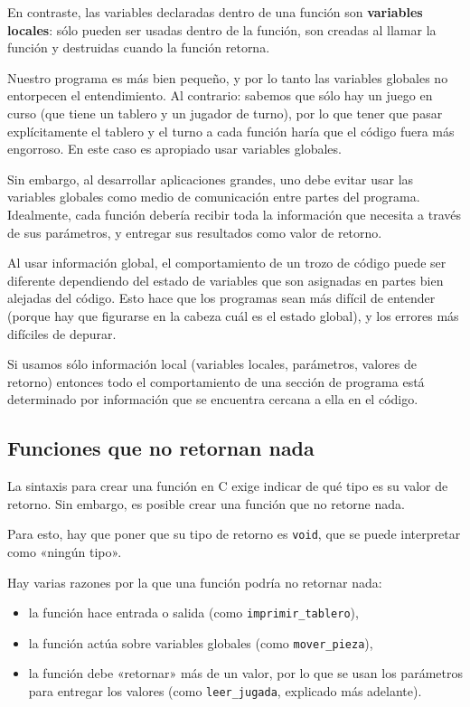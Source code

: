 En contraste, las variables declaradas dentro de una función son
\textbf{variables locales}: sólo pueden ser usadas dentro de la función,
son creadas al llamar la función y destruidas cuando la función retorna.

Nuestro programa es más bien pequeño, y por lo tanto las variables
globales no entorpecen el entendimiento. Al contrario: sabemos que sólo
hay un juego en curso (que tiene un tablero y un jugador de turno), por
lo que tener que pasar explícitamente el tablero y el turno a cada
función haría que el código fuera más engorroso. En este caso es
apropiado usar variables globales.

Sin embargo, al desarrollar aplicaciones grandes, uno debe evitar usar
las variables globales como medio de comunicación entre partes del
programa. Idealmente, cada función debería recibir toda la información
que necesita a través de sus parámetros, y entregar sus resultados como
valor de retorno.

Al usar información global, el comportamiento de un trozo de código
puede ser diferente dependiendo del estado de variables que son
asignadas en partes bien alejadas del código. Esto hace que los
programas sean más difícil de entender (porque hay que figurarse en la
cabeza cuál es el estado global), y los errores más difíciles de
depurar.

Si usamos sólo información local (variables locales, parámetros, valores
de retorno) entonces todo el comportamiento de una sección de programa
está determinado por información que se encuentra cercana a ella en el
código.

\subsection{Funciones que no retornan nada}

La sintaxis para crear una función en C exige indicar de qué tipo es su
valor de retorno. Sin embargo, es posible crear una función que no
retorne nada.

Para esto, hay que poner que su tipo de retorno es \lstinline!void!, que
se puede interpretar como «ningún tipo».

Hay varias razones por la que una función podría no retornar nada:

\begin{itemize}
\item
  la función hace entrada o salida (como \lstinline!imprimir_tablero!),
\item
  la función actúa sobre variables globales (como
  \lstinline!mover_pieza!),
\item
  la función debe «retornar» más de un valor, por lo que se usan los
  parámetros para entregar los valores (como \lstinline!leer_jugada!,
  explicado más adelante).
\end{itemize}

